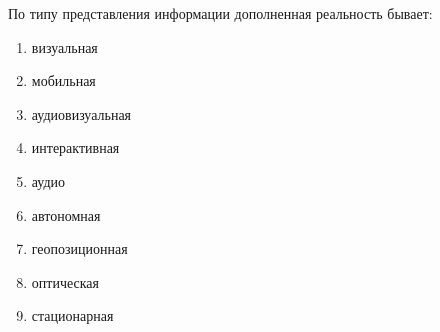 
По типу представления информации дополненная реальность бывает:

\begin{enumerate}
    \item визуальная
    \item мобильная
    \item аудиовизуальная
    \item интерактивная
    \item аудио
    \item автономная
    \item геопозиционная
    \item оптическая
    \item стационарная
\end{enumerate}

